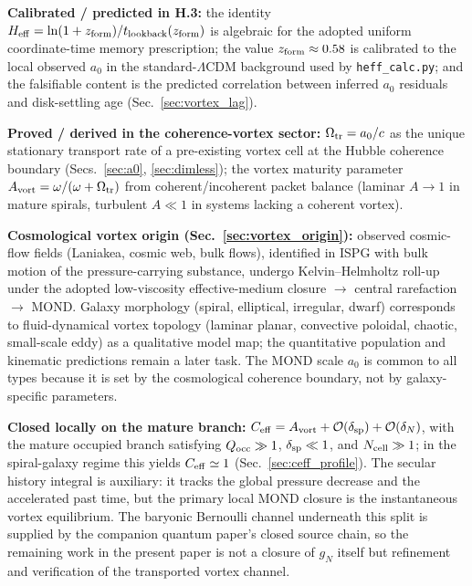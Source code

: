 \documentclass[11pt]{article}
\begin{document}
\textbf{Calibrated / predicted in H.3:}
the identity $H_{\rm eff}=\ln(1+z_{\rm form})/
t_{\rm lookback}(z_{\rm form})$ is algebraic for the adopted uniform
coordinate-time memory prescription; the value
$z_{\rm form}\approx0.58$ is calibrated to the local observed
$a_0$ in the standard-$\Lambda$CDM background used by
\texttt{heff\_calc.py}; and the falsifiable content is the predicted
correlation between inferred $a_0$ residuals and disk-settling age
(Sec.~\ref{sec:vortex_lag}).

\textbf{Proved / derived in the coherence-vortex sector:}
$\Omega_{\rm tr}=a_0/c$ as the unique stationary transport rate of a
pre-existing vortex cell at the Hubble coherence boundary
(Secs.~\ref{sec:a0}, \ref{sec:dimless}); the vortex maturity parameter
$A_{\rm vort}=\omega/(\omega+\Omega_{\rm tr})$ from coherent/incoherent
packet balance (laminar $A\!\to\!1$ in mature spirals, turbulent
$A\!\ll\!1$ in systems lacking a coherent vortex).

\textbf{Cosmological vortex origin
(Sec.~\ref{sec:vortex_origin}):}
observed cosmic-flow fields (Laniakea, cosmic web, bulk flows),
identified in ISPG with bulk motion of the pressure-carrying substance,
undergo Kelvin--Helmholtz roll-up under the adopted low-viscosity
effective-medium closure $\to$ central rarefaction $\to$ MOND.  Galaxy
morphology (spiral, elliptical, irregular, dwarf) corresponds to
fluid-dynamical vortex topology (laminar planar, convective poloidal,
chaotic, small-scale eddy) as a qualitative model map; the quantitative
population and kinematic predictions remain a later task.  The MOND
scale $a_0$ is common to all types because it is set by the cosmological
coherence boundary, not by galaxy-specific parameters.

\textbf{Closed locally on the mature branch:} $C_{\rm eff}=A_{\rm vort}
+\mathcal{O}(\delta_{\rm sp})+\mathcal{O}(\delta_N)$, with the mature
occupied branch satisfying $Q_{\rm occ}\gg1$, $\delta_{\rm sp}\ll1$,
and $N_{\rm cell}\gg1$; in the spiral-galaxy regime this yields
$C_{\rm eff}\simeq1$ (Sec.~\ref{sec:ceff_profile}).  The secular
history integral is auxiliary: it tracks the global pressure
decrease and the accelerated past time, but the primary local
MOND closure is the instantaneous vortex equilibrium.  The baryonic
Bernoulli channel underneath this split is supplied by the companion
quantum paper's closed source chain, so the remaining work in the
present paper is not a closure of $g_N$ itself but refinement and
verification of the transported vortex channel.
\end{document}
